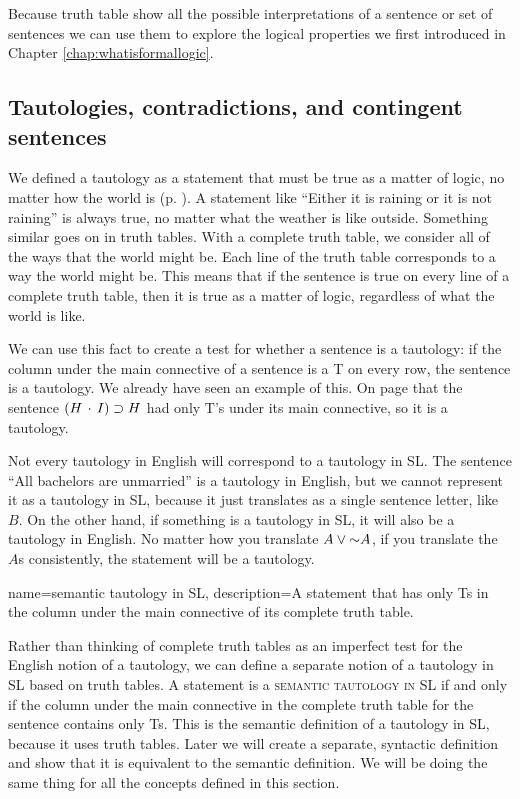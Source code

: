Because truth table show all the possible interpretations of a sentence or set of sentences we can use them to explore the logical properties we first introduced in Chapter \ref{chap:whatisformallogic}.

\subsection{Tautologies, contradictions, and contingent sentences}
We defined a tautology as a statement that must be true as a matter of logic, no matter how the world is (p. \pageref{def:tautology}). A statement like ``Either it is raining or it is not raining'' is always true, no matter what the weather is like outside. Something similar goes on in truth tables. With a complete truth table, we consider all of the ways that the world might be. Each line of the truth table corresponds to a way the world might be. This means that if the sentence is true on every line of a complete truth table, then it is true as a matter of logic, regardless of what the world is like.

We can use this fact to create a test for whether a sentence is a tautology: if the column under the main connective of a sentence is a T on every row, the sentence is a tautology. We already have seen an example of this. On page \pageref{tautology3.1} that the sentence $(H \,\cdot\, I)\supset H$ had only T's under its main connective, so it is a tautology.

Not every tautology in English will correspond to a tautology in SL. The sentence ``All bachelors are unmarried'' is a tautology in English, but we cannot represent it as a tautology in SL, because it just translates as a single sentence letter, like $B$. On the other hand, if something is a tautology in SL, it will also be a tautology in English. No matter how you translate $A \vee \mathord{\sim} A$, if you translate the $A$s consistently, the statement will be a tautology. 

{
name=semantic tautology in SL,
description={A statement that has only Ts in the column under the main connective of its complete truth table.}
}

\label{semantic_definitions_in_SL}
Rather than thinking of complete truth tables as an imperfect test for the English notion of a tautology, we can define a separate notion of a tautology in SL based on truth tables. A statement is a \textsc{\gls{semantic tautology in SL}} \label{def:semantic_tautology_in_sl} if and only if the column  under the main connective in the complete truth table for the sentence contains only Ts. This is the semantic definition of a tautology in SL, because it uses truth tables. Later we will create a separate, syntactic definition and show that it is equivalent to the semantic definition. We will be doing the same thing for all the concepts defined in this section. 

